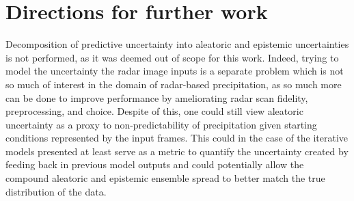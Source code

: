 \section{Directions for further work}

Decomposition of predictive uncertainty into aleatoric and epistemic uncertainties is not performed, as it was deemed out of scope for this work. Indeed, trying to model the uncertainty the radar image inputs is a separate problem which is not so much of interest in the domain of radar-based precipitation, as so much more can be done to improve performance by ameliorating radar scan fidelity, preprocessing, and choice. Despite of this, one could still view aleatoric uncertainty as a proxy to non-predictability of precipitation given starting conditions represented by the input frames. This could in the case of the iterative models presented at least serve as a metric to quantify the uncertainty created by feeding back in previous model outputs and could potentially allow the compound aleatoric and epistemic ensemble spread to better match the true distribution of the data. 

